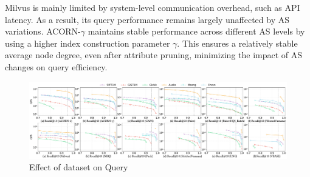 \documentclass[sigconf, nonacm]{acmart}
\begin{document}
Milvus is mainly limited by system-level communication overhead, such as API latency. As a result, its query performance remains largely unaffected by AS variations. ACORN-\(\gamma\) maintains stable performance across different AS levels by using a higher index construction parameter $\gamma$. This ensures a relatively stable average node degree, even after attribute pruning, minimizing the impact of AS changes on query efficiency.

\begin{figure}
    \centering
    \setlength{\abovecaptionskip}{0cm}
    \setlength{\belowcaptionskip}{-0.4cm}
    \includegraphics[width=\textwidth]{figures/exp/exp_6_1.pdf}
    \caption{Effect of dataset on Query}
    \label{fig:exp_6_1}
\end{figure}


\begin{table}[t]
\centering
\setlength{\abovecaptionskip}{0.05cm}
\caption{Time and space overhead of range filtering index construction}
\label{tab:Range Filtered}
\end{table}
\end{document}
